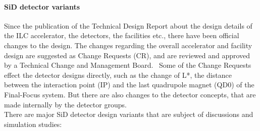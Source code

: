 \paragraph{SiD detector variants}
Since the publication of the Technical Design Report about the design details of the ILC accelerator, the detectors, the facilities etc., there have been official changes to the design.
The changes regarding the overall accelerator and facility design are suggested as Change Requests (CR), and are reviewed and approved by a Technical Change and Management Board.~\cite{TCMB} 
Some of the Change Requests effect the detector designs directly, such as the change of L*, the distance between the interaction point (IP) and the last quadrupole magnet (QD0) of the Final-Focus system.
But there are also changes to the detector concepts, that are made internally by the detector groups.\\
There are major SiD detector design variants that are subject of discussions and simulation studies:
